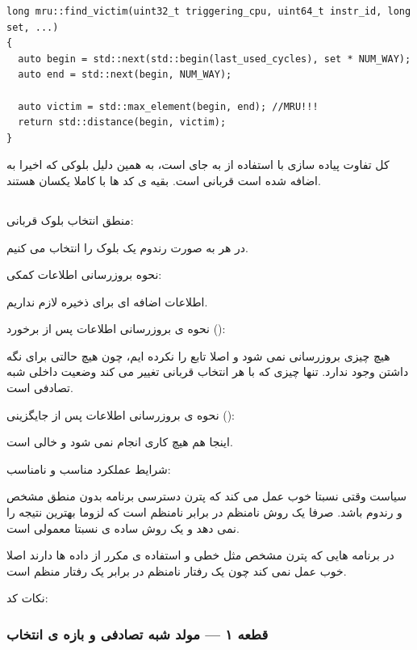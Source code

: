 \documentclass[12pt,a4paper]{article}
\begin{document}
\begin{latin}
\begin{lstlisting}
long mru::find_victim(uint32_t triggering_cpu, uint64_t instr_id, long set, ...)
{
  auto begin = std::next(std::begin(last_used_cycles), set * NUM_WAY);
  auto end = std::next(begin, NUM_WAY);

  auto victim = std::max_element(begin, end); //MRU!!!
  return std::distance(begin, victim);
}
\end{lstlisting}
\end{latin}

کل تفاوت پیاده سازی با  استفاده از  به جای  است، به همین دلیل بلوکی که اخیرا به  اضافه شده است قربانی است. بقیه ی کد ها با  کاملا یکسان هستند.

\subsection{}

منطق انتخاب بلوک قربانی:

در هر  به صورت رندوم یک بلوک را انتخاب می کنیم.

نحوه بروزرسانی اطلاعات کمکی:

اطلاعات اضافه ای برای ذخیره لازم نداریم.

نحوه ی بروزرسانی اطلاعات پس از برخورد ():

هیچ چیزی بروزرسانی نمی شود و اصلا تابع  را  نکرده ایم، چون هیچ حالتی برای نگه داشتن وجود ندارد. تنها چیزی که با هر انتخاب قربانی تغییر می کند وضعیت داخلی  شبه تصادفی است.

نحوه ی بروزرسانی اطلاعات پس از جایگزینی ():

اینجا هم هیچ کاری انجام نمی شود و  خالی است.

شرایط عملکرد مناسب و نامناسب:

سیاست  وقتی نسبتا خوب عمل می کند که پترن دسترسی برنامه بدون منطق مشخص و رندوم باشد. صرفا یک روش نامنظم در برابر نامنظم است که لزوما بهترین نتیجه را نمی دهد و یک روش ساده ی نسبتا معمولی است.

در برنامه هایی که پترن مشخص مثل  خطی و استفاده ی مکرر از داده ها دارند اصلا خوب عمل نمی کند چون یک رفتار نامنظم در برابر یک رفتار منظم است.

نکات کد:

\subsubsection{قطعه ۱ — مولد شبه تصادفی و بازه ی انتخاب}
\end{document}
